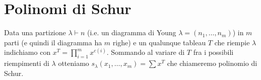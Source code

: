 \chapter{Polinomi di Schur}

\begin{defn}
Data una partizione $\lambda \vdash n$ (i.e. un diagramma di Young
$\lambda = (n_1, \ldots, n_m)$) in $m$ parti (e quindi il diagramma ha
$m$ righe) e un qualunque tableau $T$ che riempie $\lambda$ indichiamo
con $x^T = \prod\limits_{i = 1}^m x^{c(i)}$. Sommando al variare di
$T$ fra i possibili riempimenti di $\lambda$ otteniamo
\begin{math}
s_\lambda(x_1,\ldots,x_m) = \sum x^T
\end{math}
che chiameremo polinomio di Schur.
\end{defn}
